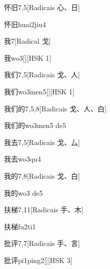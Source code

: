 \begin{entry}{怀旧}{7,5}[Radicais ⼼、⽇]
  \begin{phonetics}{怀旧}{huai2jiu4}
  \end{phonetics}
\end{entry}

\begin{entry}{我}{7}[Radical ⼽]
  \begin{phonetics}{我}{wo3}[][HSK 1]
  \end{phonetics}
\end{entry}

\begin{entry}{我们}{7,5}[Radicais ⼽、⼈]
  \begin{phonetics}{我们}{wo3men5}[][HSK 1]
  \end{phonetics}
\end{entry}

\begin{entry}{我们的}{7,5,8}[Radicais ⼽、⼈、⽩]
  \begin{phonetics}{我们的}{wo3men5 de5}
  \end{phonetics}
\end{entry}

\begin{entry}{我去}{7,5}[Radicais ⼽、⼛]
  \begin{phonetics}{我去}{wo3qu4}
  \end{phonetics}
\end{entry}

\begin{entry}{我的}{7,8}[Radicais ⼽、⽩]
  \begin{phonetics}{我的}{wo3 de5}
  \end{phonetics}
\end{entry}

\begin{entry}{扶梯}{7,11}[Radicais ⼿、⽊]
  \begin{phonetics}{扶梯}{fu2ti1}
  \end{phonetics}
\end{entry}

\begin{entry}{批评}{7,7}[Radicais ⼿、⾔]
  \begin{phonetics}{批评}{pi1ping2}[][HSK 3]
  \end{phonetics}
\end{entry}

